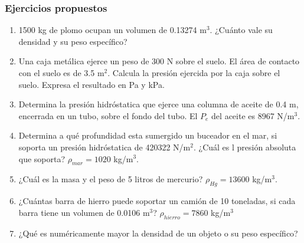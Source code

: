\documentclass[handout]{beamer}
\begin{document}
\begin{frame}[allowframebreaks,t]
  \frametitle{Ejercicios propuestos}
  \begin{enumerate}
  \item 1500 kg de plomo ocupan un volumen de 0.13274 m$^3$. ¿Cuánto vale su densidad y su
    peso específico?
  \item Una caja metálica ejerce un peso de 300 N sobre el suelo. El área de contacto con
    el suelo es de 3.5 m$^2$. Calcula la presión ejercida por la caja sobre el
    suelo. Expresa el resultado en Pa y kPa.
  \item Determina la presión hidróstatica que ejerce una columna de aceite de 0.4 m, encerrada en un
    tubo, sobre el fondo del tubo. El $P_{e}$ del aceite es 8967 N/m$^3$.
  \item Determina a qué profundidad esta sumergido un buceador en el mar, si soporta un
    presión hidróstatica de 420322 N/m$^2$. ¿Cuál es l presión absoluta que soporta? $\rho_{mar} = 1020 $ kg/m$^3$. 
  \item ¿Cuál es la masa y el peso de 5 litros de mercurio? $\rho_{Hg} = 13600$ kg/m$^3$.
  \item ¿Cuántas barra de hierro puede soportar un camión de 10 toneladas, si cada barra
    tiene un volumen de 0.0106 m$^3$? $\rho_{hierro} = 7860$ kg/m$^3$
  \item ¿Qué es numéricamente mayor la densidad de un objeto o su peso específico?
  \end{enumerate}
\end{frame}
\end{document}
